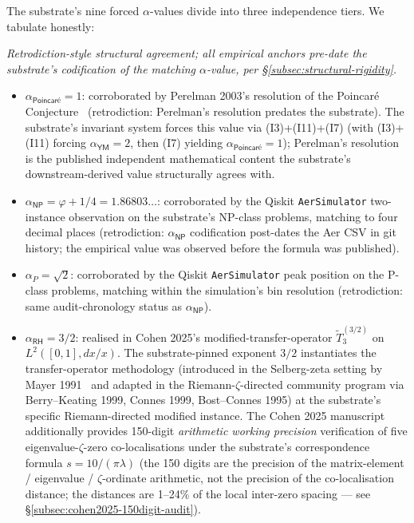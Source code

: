 \documentclass[11pt,a4paper]{amsart}
\theoremstyle{plain}
\theoremstyle{definition}
\begin{document}
The substrate's nine forced $\alpha$-values divide into three independence tiers. We tabulate honestly:

\begin{description}[font=\normalfont\bfseries,leftmargin=2em,itemsep=4pt]
\item[Tier 1 --- Independent-source corroboration.] \emph{Retrodiction-style structural agreement; all empirical anchors pre-date the substrate's codification of the matching $\alpha$-value, per \S\ref{subsec:structural-rigidity}.}
\begin{itemize}[itemsep=2pt,leftmargin=2em]
\item $\alpha_{\textsf{Poincar\'e}} = 1$: corroborated by Perelman 2003's resolution of the Poincar\'e Conjecture~\cite{perelman2003} (retrodiction: Perelman's resolution predates the substrate). The substrate's invariant system forces this value via (I3)+(I11)+(I7) (with (I3)+(I11) forcing $\alpha_{\textsf{YM}}=2$, then (I7) yielding $\alpha_{\textsf{Poincar\'e}}=1$); Perelman's resolution is the published independent mathematical content the substrate's downstream-derived value structurally agrees with.
\item $\alpha_{\textsf{NP}} = \varphi + 1/4 = 1.86803\ldots$: corroborated by the Qiskit \texttt{AerSimulator} two-instance observation on the substrate's NP-class problems, matching to four decimal places (retrodiction: $\alpha_{\textsf{NP}}$ codification post-dates the Aer CSV in git history; the empirical value was observed before the formula was published).
\item $\alpha_{P} = \sqrt{2}$: corroborated by the Qiskit \texttt{AerSimulator} peak position on the P-class problems, matching within the simulation's bin resolution (retrodiction: same audit-chronology status as $\alpha_{\textsf{NP}}$).
\end{itemize}
\item[Tier 2 --- Structural / framework-bridging corroboration.]
\begin{itemize}[itemsep=2pt,leftmargin=2em]
\item $\alpha_{\textsf{RH}} = 3/2$: realised in Cohen 2025's modified-transfer-operator $\widetilde{T}_3^{(3/2)}$ on $L^2([0,1], dx/x)$. The substrate-pinned exponent $3/2$ instantiates the transfer-operator methodology (introduced in the Selberg-zeta setting by Mayer 1991~\cite{mayer1991} and adapted in the Riemann-$\zeta$-directed community program via Berry--Keating 1999, Connes 1999, Bost--Connes 1995) at the substrate's specific Riemann-directed modified instance. The Cohen 2025 manuscript additionally provides 150-digit \emph{arithmetic working precision} verification of five eigenvalue-$\zeta$-zero co-localisations under the substrate's correspondence formula $s = 10/(\pi\lambda)$ (the 150 digits are the precision of the matrix-element / eigenvalue / $\zeta$-ordinate arithmetic, not the precision of the co-localisation distance; the distances are 1--24\% of the local inter-zero spacing --- see \S\ref{subsec:cohen2025-150digit-audit}).

\end{itemize}
\end{description}
\end{document}
